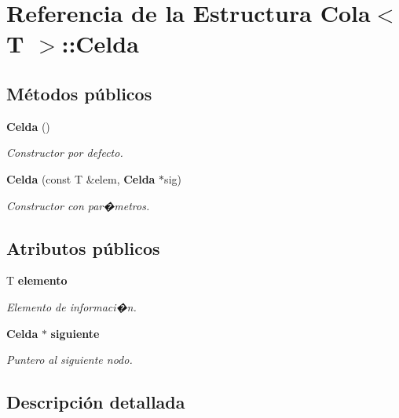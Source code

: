 \section{Referencia de la Estructura Cola$<$ T $>$\-:\-:Celda}
\label{structCola_1_1Celda}
\subsection*{Métodos públicos}
\begin{DoxyCompactItemize}
\item 
{\bf Celda} ()\label{structCola_1_1Celda_a1ae66a8f4dad33d2bc811f0ac13150b9}

\begin{DoxyCompactList}\small\item\em Constructor por defecto. \end{DoxyCompactList}\item 
{\bf Celda} (const T \&elem, {\bf Celda} $\ast$sig)
\begin{DoxyCompactList}\small\item\em Constructor con par�metros. \end{DoxyCompactList}\end{DoxyCompactItemize}
\subsection*{Atributos públicos}
\begin{DoxyCompactItemize}
\item 
T {\bf elemento}\label{structCola_1_1Celda_af84ab659f7018e350c890fc6abb8a338}

\begin{DoxyCompactList}\small\item\em Elemento de informaci�n. \end{DoxyCompactList}\item 
{\bf Celda} $\ast$ {\bf siguiente}\label{structCola_1_1Celda_a7c389dfd00b09d44632a6d179c79961b}

\begin{DoxyCompactList}\small\item\em Puntero al siguiente nodo. \end{DoxyCompactList}\end{DoxyCompactItemize}


\subsection{Descripción detallada}
